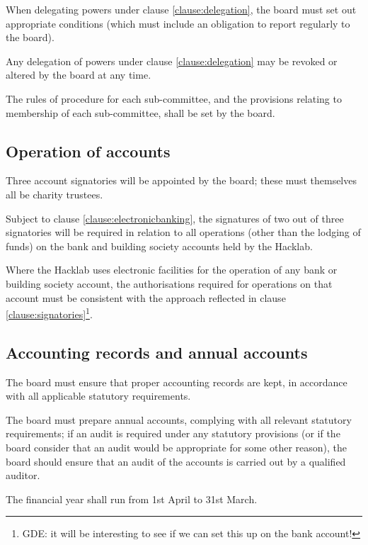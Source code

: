 \documentclass{article}
\begin{document}
\clause When delegating powers under clause \ref{clause:delegation},
the board must set out appropriate conditions (which must include an
obligation to report regularly to the board).

\clause Any delegation of powers under clause \ref{clause:delegation}
may be revoked or altered by the board at any time.

\clause The rules of procedure for each sub-committee, and the
provisions relating to membership of each sub-committee, shall be set
by the board.

\subsection{Operation of accounts}

\clause Three account signatories will be appointed by the board;
these must themselves all be charity trustees.

\clause\label{clause:signatories}Subject to clause
\ref{clause:electronicbanking}, the signatures of two out of three
signatories will be required in relation to all
operations (other than the lodging of funds) on the bank and building
society accounts held by the Hacklab.

\clause\label{clause:electronicbanking}Where the Hacklab uses
electronic facilities for the operation of any bank or building
society account, the authorisations required for operations on that
account must be consistent with the approach reflected in clause
\ref{clause:signatories}\footnote{GDE: it will be interesting to see
  if we can set this up on the bank account!}.

\subsection{Accounting records and annual accounts}

\clause The board must ensure that proper accounting records are kept,
in accordance with all applicable statutory requirements.

\clause The board must prepare annual accounts, complying with all
relevant statutory requirements; if an audit is required under any
statutory provisions (or if the board consider that an audit would be
appropriate for some other reason), the board should ensure that an
audit of the accounts is carried out by a qualified auditor.

\clause The financial year shall run from 1st April to 31st March.
\end{document}
